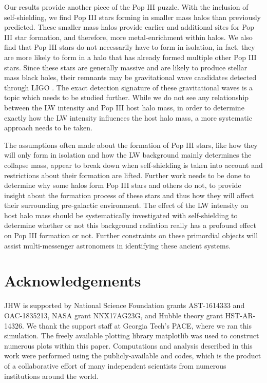 \documentclass[fleqn,usenatbib]{mnras}
\begin{document}
Our results provide another piece of the Pop III puzzle. With the inclusion of \hh{} self-shielding, we find Pop III stars forming in smaller mass halos than previously predicted. These smaller mass halos provide earlier and additional sites for Pop III star formation, and therefore, more metal-enrichment within halos. We also find that Pop III stars do not necessarily have to form in isolation, in fact, they are more likely to form in a halo that has already formed multiple other Pop III stars. Since these stars are generally massive and are likely to produce stellar mass black holes, their remnants may be gravitational wave candidates detected through LIGO \citep{Hartwig16}. The exact detection signature of these gravitational waves is a topic which needs to be studied further. While we do not see any relationship between the LW intensity and Pop III host halo mass,  in order to determine exactly how the LW intensity influences the host halo mass, a more systematic approach needs to be taken. 

The assumptions often made about the formation of Pop III stars, like how they will only form in isolation and how the LW background mainly determines the collapse mass, appear to break down when self-shielding is taken into account and restrictions about their formation are lifted. Further work needs to be done to determine why some halos form Pop III stars and others do not, to provide insight about the formation process of these stars and thus how they will affect their surrounding pre-galactic environment. The effect of the LW intensity on host halo mass should be systematically investigated with \hh{} self-shielding to determine whether or not this background radiation really has a profound effect on Pop III formation or not. Further constraints on these primordial objects will assist multi-messenger astronomers in identifying these ancient systems.

\section*{Acknowledgements}

JHW is supported by National Science Foundation grants AST-1614333 and OAC-1835213, NASA grant NNX17AG23G, and Hubble theory grant
HST-AR-14326.  We thank the support staff at Georgia Tech's PACE,
where we ran this simulation.  The freely available plotting library
{\sc matplotlib} \citep{matplotlib} was used to construct numerous
plots within this paper. Computations and analysis described in this
work were performed using the publicly-available \enzo{} and \yt{}
codes, which is the product of a collaborative effort of many
independent scientists from numerous institutions around the world.
\end{document}
